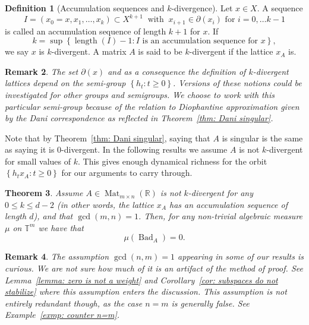 \documentclass[reqno,11pt, twoside]{amsart}
\theoremstyle{plain}
\newtheorem{thm}{Theorem}[section]
\newtheorem{rem}[thm]{Remark}
\theoremstyle{definition}
\newtheorem{defn}[thm]{Definition}
\theoremstyle{definition}
\theoremstyle{remark}
\numberwithin{equation}{section}
\newcommand{\bR}{\mathbb{R}}
\newcommand{\bT}{\mathbb{T}}
\newcommand\seta[1]{\left\{#1\right\}}
\newcommand\on[1]{\operatorname{#1}}
\begin{document}
\begin{defn}[Accumulation sequences and $k$-divergence]\label{defn: kdiv lattice}
    Let $x \in X$. A sequence
    \begin{equation*}
        I = (x_0=x, x_1, \dots , x_k) \subset X^{k+1}\ \text{ with }\ x_{i+1} \in \partial(x_i) \text{ for } i=0,\dots k-1
    \end{equation*}
    is called an accumulation sequence of length $k+1$ for $x$.
    If 
    \begin{equation*}
        k= \sup \left\lbrace \on{length}(I) - 1 : I \text{ is an accumulation sequence for } x\right\rbrace,
    \end{equation*}
    we say $x$ is $k$-divergent. A matrix $A$ is said to be $k$-divergent if the lattice $x_A$ is.
\end{defn}
\begin{rem}
    The set $\partial(x)$ and as a consequence the definition of $k$-divergent lattices depend on the semi-group $\seta{h_t:t\ge0}$. Versions 
    of these notions could be investigated for other groups and semigroups. We choose to work with this particular semi-group because of the relation to Diophantine approximation given by the Dani correspondence as reflected in Theorem~\ref{thm: Dani singular}.
\end{rem}
Note that by Theorem~\ref{thm: Dani singular}, saying that $A$ is singular is the same as saying it is $0$-divergent. In the following results we assume $A$ is not $k$-divergent for small values of $k$. This gives enough dynamical richness for the orbit $\seta{h_tx_A:t\ge 0}$ for our arguments to carry through.  
\begin{thm}\label{thm: 1 dim in Zm-2}
    Assume  $A\in \on{Mat}_{m\times n}(\bR)$ is not $k$-divergent for
    any $0\le k\leq d-2$ (in other words, the lattice $x_A$ has an accumulation sequence of length $d$), and that $\gcd(m,n)=1$. Then, for any non-trivial algebraic measure $\mu$ on $\bT^m$ we have that 
    $$\mu(\on{Bad}_A) = 0.$$
\end{thm}
\begin{rem}
    The assumption $\gcd(n,m)=1$ appearing in some of our results is curious.  We are not sure how much of it is an artifact of the method of proof.
    See Lemma~\ref{lemma: zero is not a weight} and Corollary~\ref{cor: subspaces do not stabilize} where this assumption enters the discussion. This assumption is not entirely redundant though, as 
    the case $n=m$ is generally false. See Example~\ref{exmp: counter n=m}.
\end{rem}
\end{document}
